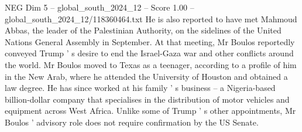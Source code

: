 \begin{textsample}{NEG Dim 5 – global\_south\_2024\_12 – Score 1.00 – global\_south\_2024\_12/118360464.txt}
He is also reported to have met Mahmoud Abbas, the leader of the Palestinian Authority, on the sidelines of the United Nations General Assembly in September.
At that meeting, Mr Boulos reportedly conveyed Trump ' s desire to end the Israel-Gaza war and other conflicts around the world.
Mr Boulos moved to Texas as a teenager, according to a profile of him in the New Arab, where he attended the University of Houston and obtained a law degree.
He has since worked at his family ' s business -- a Nigeria-based billion-dollar company that specialises in the distribution of motor vehicles and equipment across West Africa.
Unlike some of Trump ' s other appointments, Mr Boulos ' advisory role does not require confirmation by the US Senate.

\end{textsample}
